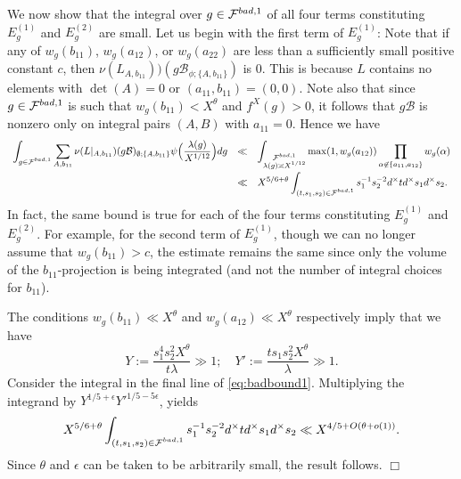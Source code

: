 \documentclass[10pt,a4paper]{amsart}
\def\FF{{\mathcal F}}
\def\bad{{\rm bad}}
\def\cB{{\mathcal B}}
\newenvironment{proof}{\noindent {\bf Proof:}}{$\Box$ \vspace{2 ex}}
\begin{document}
\begin{proof}
We now show that the integral over $g\in\FF^{\bad,1}$ of all four
terms constituting $E_g^{(1)}$ and $E_g^{(2)}$ are small.
Let us begin
with the first term of $E_g^{(1)}$: Note that if any of $w_g(b_{11})$, $w_g(a_{12})$, or $w_g(a_{22})$ are less than a sufficiently small positive constant $c$, then
$\nu(L_{A,b_{11}}))(g\cB_{\phi;\{A,b_{11}\}})$ is $0$. This is because $L$ contains no elements with $\det(A)=0$ or $(a_{11},b_{11})=(0,0)$.
Note also that since $g\in\FF^{\bad,1}$ is such that $w_g(b_{11})<X^\theta$ and $f^X(g)>0$, it follows that $g\cB$ is nonzero only on integral pairs $(A,B)$ with $a_{11}=0$. Hence we have
\begin{equation}\label{eq:badbound1}
\begin{array}{rcl}
  \displaystyle  \int_{\substack{g\in\FF^{\bad,1}}}\sum_{A,b_{11}}\nu(L|_{A,b_{11}})(g\cB)_{\emptyset;\{A,b_{11}\}}\psi\Bigl(
\frac{\lambda(g)}{X^{1/12}}
\Bigr)dg&\ll& \displaystyle\int_{\substack{\FF^{\bad,1}\\\lambda(g)\asymp X^{1/12}}}\max(1,w_g(a_{12}))\prod_{\alpha\not\in\{a_{11},a_{12}\}}w_g(\alpha)
\\[.2in]&\ll&\displaystyle
X^{5/6+\theta}\int_{\substack{(t,s_1,s_2)\in\FF^{\bad,1}}}s_1^{-1}s_2^{-2}d^\times td^\times s_1 d^\times s_2.
\end{array}
\end{equation}
In fact, the same bound is true for each of the four terms
constituting $E_g^{(1)}$ and $E_g^{(2)}$. For example, for the second
term of $E_g^{(1)}$, though we can no longer assume that
$w_g(b_{11})>c$, the estimate remains the same since only the volume of the $b_{11}$-projection is being integrated (and not the number of integral choices for $b_{11}$).

The conditions $w_g(b_{11})\ll X^\theta$ and $w_g(a_{12})\ll X^\theta$
respectively imply that we have
\begin{equation*}
Y:=\frac{s_1^4s_2^2 X^\theta}{t\lambda}\gg 1;\quad
Y':=\frac{ts_1s_2^2 X^\theta}{\lambda}\gg 1.
\end{equation*}
Consider the integral in the final line of
\eqref{eq:badbound1}. Multiplying the integrand
by $Y^{1/5+\epsilon}Y'^{1/5-5\epsilon}$, yields
\begin{equation*}
  X^{5/6+\theta}\int_{\substack{(t,s_1,s_2)\in\FF^{\bad,1}}}s_1^{-1}s_2^{-2}d^\times td^\times s_1 d^\times s_2
\ll X^{4/5+O(\theta+o(1))}.
\end{equation*}
Since $\theta$ and $\epsilon$ can be taken to be arbitrarily small, the result follows.
\end{proof}
\end{document}
